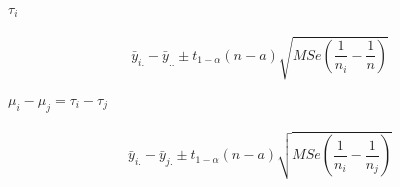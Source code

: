 \paragraph{$\tau_i$}
\begin{equation*}
	\bar{y}_{i.}-\bar{y}_{..}\pm t_{1-\alpha}(n-a)\sqrt{MSe\left(\frac{1}{n_i}-\frac{1}{n}\right)}
\end{equation*}
\paragraph{$\mu_i-\mu_j=\tau_i-\tau_j$}
\begin{equation*}
	\bar{y}_{i.}-\bar{y}_{j.}\pm t_{1-\alpha}(n-a)\sqrt{MSe\left(\frac{1}{n_i}-\frac{1}{n_j}\right)}
\end{equation*}